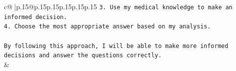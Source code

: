 \documentclass{article}
\begin{document}
{\begin{supertabular}{c@{$\;$}|p{.15\linewidth}@{}p{.15\linewidth}p{.15\linewidth}p{.15\linewidth}p{.15\linewidth}p{.15\linewidth}}
{{{\texttt{3. Use my medical knowledge to make an informed decision.} \\
\texttt{4. Choose the most appropriate answer based on my analysis.} \\
\\ 
\texttt{By following this approach, I will be able to make more informed decisions and answer the questions correctly.} \\
            }
        }
    }
    & \\ \\

\end{supertabular}
}
\end{document}
